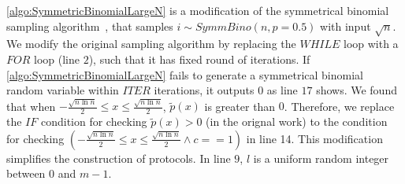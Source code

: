 \autoref{algo:SymmetricBinomialLargeN} is a modification of the symmetrical binomial sampling algorithm~\cite{googleDP2019}, that samples $i\sim SymmBino\left(n,p=0.5\right) $ with input $\sqrt{n}$. We modify the original sampling algorithm by replacing the $WHILE$ loop with a $FOR$ loop (line $2$), such that it has fixed round of iterations. If \autoref{algo:SymmetricBinomialLargeN} fails to generate a symmetrical binomial random variable within $ITER$ iterations, it outputs $0$ as line $17$ shows. We found that when $-\frac{\sqrt{n\ln n}}{2} \leq x \leq \frac{\sqrt{n\ln n}}{2}$, $\tilde{p}\left(x\right)$ is greater than $0$. Therefore, we replace the $IF$ condition for checking $\tilde{p}\left(x\right)>0$ (in the orignal work) to the condition for checking $\left(-\frac{\sqrt{n\ln n}}{2} \leq x \leq \frac{\sqrt{n\ln n}}{2} \land c==1\right) $ in line 14. This modification simplifies the construction of \smpc protocols. In line $9$, $l$ is a uniform random integer between $0$ and $m-1$.




